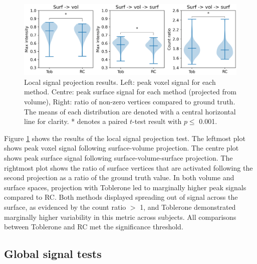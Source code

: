 \documentclass[12pt]{report}
\begin{document}
\begin{figure}[H]
\centering
\includegraphics[width=\textwidth]{activation_results}
\caption{Local signal projection results. Left: peak voxel signal for each method. Centre: peak surface signal for each method (projected from volume), Right: ratio of non-zero vertices compared to ground truth. The means of each distribution are denoted with a central horizontal line for clarity. * denotes a paired $t$-test result with $p\leq $ 0.001.}
\label{local_results} 
\end{figure}

Figure \ref{local_results} shows the results of the local signal projection test. The leftmost plot shows peak voxel signal following surface-volume projection. The centre plot shows peak surface signal following surface-volume-surface projection. The rightmost plot shows the ratio of surface vertices that are activated following the second projection as a ratio of the ground truth value. In both volume and surface spaces, projection with Toblerone led to marginally higher peak signals compared to RC. Both methods displayed spreading out of signal across the surface, as evidenced by the count ratio $>$ 1, and Toblerone demonstrated marginally higher variability in this metric across subjects. All comparisons between Toblerone and RC met the significance threshold. 

\subsection{Global signal tests}
\end{document}
